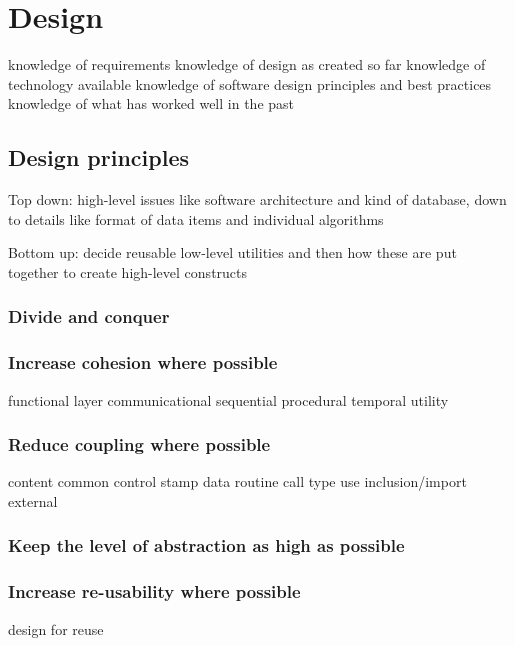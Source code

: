 \chapter{Design}


knowledge of requirements
knowledge of design as created so far
knowledge of technology available
knowledge of software design principles and best practices
knowledge of what has worked well in the past


\section{Design principles}

Top down: high-level issues like software architecture and kind of database, down to details like format of data items and individual algorithms

Bottom up: decide reusable low-level utilities and then how these are put together to create high-level constructs

\subsection{Divide and conquer}

\subsection{Increase cohesion where possible}

functional
layer
communicational
sequential
procedural
temporal
utility

\subsection{Reduce coupling where possible}

content
common
control
stamp
data
routine call
type use
inclusion/import
external

\subsection{Keep the level of abstraction as high as possible}

\subsection{Increase re-usability where possible}

design for reuse

